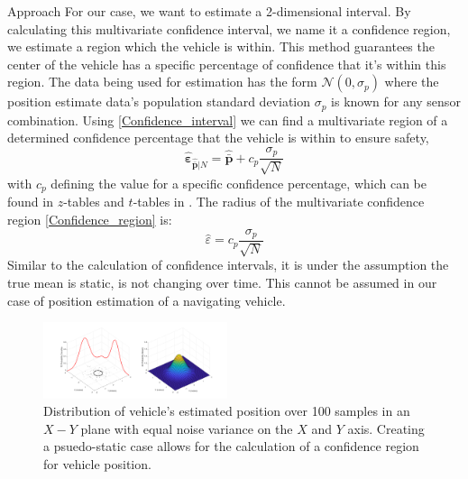 \begin{section}{Approach}
For our case, we want to estimate a 2-dimensional interval. By calculating this multivariate confidence interval, we name it a confidence region, we estimate a region which the vehicle is within. This method guarantees the center of the vehicle has a specific percentage of confidence that it's within this region. The data being used for estimation has the form $\mathcal{N}(0,\sigma_p)$ where the position estimate data's population standard deviation $\sigma_p$ is known for any sensor combination. Using \eqref{Confidence_interval} we can find a multivariate region of a determined confidence percentage that the vehicle is within to ensure safety,
    \begin{equation}
    \label{Confidence_region}
		\hat{\bm{\varepsilon}}_{\hat{\bar{\bm{p}}}|N} = \hat{\bar{\bm{p}}} + c_p\frac{\sigma_p}{\sqrt{N}}
	\end{equation}
with $c_p$ defining the value for a specific confidence percentage, which can be found in $z$-tables and $t$-tables in \cite{devore2011probability}. The radius of the multivariate confidence region \eqref{Confidence_region} is:
    \begin{equation}
		\hat{\varepsilon} = c_p\frac{\sigma_p}{\sqrt{N}}
	\end{equation}
Similar to the calculation of confidence intervals, it is under the assumption the true mean is static, is not changing over time. This cannot be assumed in our case of position estimation of a navigating vehicle. 
\begin{figure}[ht!]
\vspace{1pt}
\centering
\includegraphics[width=0.48\textwidth]{Gaussian2D.png}
\caption{Distribution of vehicle's estimated position over 100 samples in an $X-Y$ plane with equal noise variance on the $X$ and $Y$ axis. Creating a psuedo-static case allows for the calculation of a confidence region for vehicle position.}
\label{fig:gauss_pdf}
\end{figure}


\end{section}
